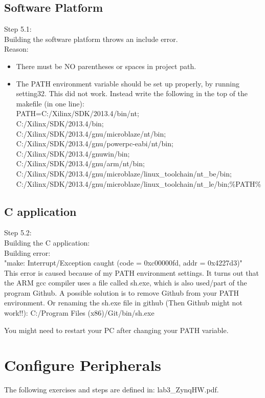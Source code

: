 \documentclass[]{report}
\begin{document}
\section{Software Platform}
Step 5.1:\\
Building the software platform throws an include error.
\\
Reason: 
\begin{itemize}
	\item There must be NO parentheses or spaces in project path.
	\item The PATH environment variable should be set up properly, by running setting32. This did not work. Instead write the following in the top of the makefile (in one line):
	\\
	PATH=C:/Xilinx/SDK/2013.4/bin/nt;\\
	C:/Xilinx/SDK/2013.4/bin; \\
	C:/Xilinx/SDK/2013.4/gnu/microblaze/nt/bin; \\
	C:/Xilinx/SDK/2013.4/gnu/powerpc-eabi/nt/bin; \\
	C:/Xilinx/SDK/2013.4/gnuwin/bin; \\
	C:/Xilinx/SDK/2013.4/gnu/arm/nt/bin; \\
	C:/Xilinx/SDK/2013.4/gnu/microblaze/linux\_toolchain/nt\_be/bin; \\
	C:/Xilinx/SDK/2013.4/gnu/microblaze/linux\_toolchain/nt\_le/bin;\%PATH\% \\
\end{itemize}

\section{C application}
Step 5.2:\\
Building the C application: \\
Building error: \\
"make: Interrupt/Exception caught (code = 0xc00000fd, addr = 0x4227d3)"\\

This error is caused because of my PATH environment settings. 
It turns out that the ARM gcc compiler uses a file called sh.exe, which is also used/part of the program Github. 
A possible solution is to remove Github from your PATH environment. Or renaming the sh.exe file in github (Then Github might not work!!): C:/Program Files (x86)/Git/bin/sh.exe 	

You might need to restart your PC after changing your PATH variable.

\chapter{Configure Peripherals}
The following exercises and steps are defined in: lab3\_ZynqHW.pdf.
\end{document}
